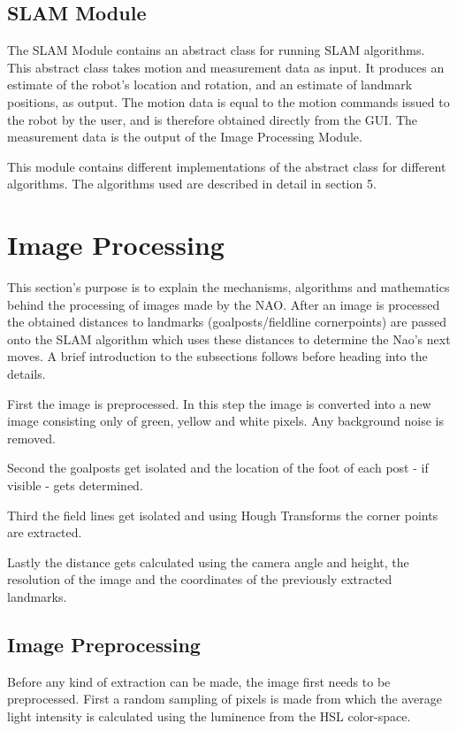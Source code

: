 \documentclass{ba-kecs}
\numberwithin{figure}{section}
\numberwithin{equation}{section}
\begin{document}
\subsection{SLAM Module}
The SLAM Module contains an abstract class for running SLAM algorithms. This abstract class takes motion and measurement data as input. It produces an estimate of the robot's location and rotation, and an estimate of landmark positions, as output. The motion data is equal to the motion commands issued to the robot by the user, and is therefore obtained directly from the GUI. The measurement data is the output of the Image Processing Module.

This module contains different implementations of the abstract class for different algorithms. The algorithms used are described in detail in section 5.



\section{Image Processing}

This section's purpose is to explain the mechanisms, algorithms and mathematics behind the processing of images made by the NAO.
After an image is processed the obtained distances to landmarks (goalposts/fieldline cornerpoints) are passed onto the SLAM algorithm which uses these distances to determine the Nao's next moves.
A brief introduction to the subsections follows before heading into the details.

First the image is preprocessed. In this step the image is converted into a new image consisting only of green, yellow and white pixels. Any background noise is removed.

Second the goalposts get isolated and the location of the foot of each post - if visible - gets determined.

Third the field lines get isolated and using Hough Transforms the corner points are extracted.

Lastly the distance gets calculated using the camera angle and height, the resolution of the image and the coordinates of the previously extracted landmarks.

\subsection{Image Preprocessing}
Before any kind of extraction can be made, the image first needs to be preprocessed. First a random sampling of pixels is made from which the average light intensity is calculated using the luminence from the HSL color-space.
\end{document}
